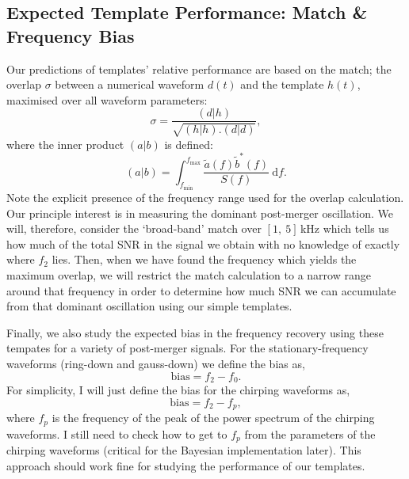 \documentclass[showpacs, superscriptaddress, showpacs, letterpaper, showkeys,
preprintnumbers, altaffilletter, amssymb, amsmath, amsfonts, prd,
onecolumn, floatfix, nofootinbib]{revtex4-1}
\newcommand{\diff}{{\mathrm d}}
\begin{document}
\subsection{Expected Template Performance: Match \& Frequency Bias}
Our predictions of templates' relative performance are based on the match; the
overlap $\sigma$ between a numerical waveform $d(t)$ and the template $h(t)$,
maximised over all waveform parameters:
%
\begin{equation}\label{eq:overlap}
\sigma = \frac{(d|h)}{\sqrt{(h|h).(d|d)}},
\end{equation}
%
where the inner product $(a|b)$ is defined:
%
\begin{equation}\label{eq:inner_product}
(a|b) = \int_{f_{\text{min}}}^{f_{\text{max}}}
\frac{\tilde{a}(f)\tilde{b}^*(f)}{S(f)}~\diff f.
\end{equation}
%
Note the explicit presence of the frequency range used for the overlap
calculation.  Our principle interest is in measuring the dominant post-merger
oscillation.  We will, therefore, consider the `broad-band' match over
$[1,~5]$\,kHz which tells us how much of the total SNR in the signal we obtain
with no knowledge of exactly where $f_2$ lies.  Then, when we have found the
frequency which yields the maximum overlap, we will restrict the match
calculation to a narrow range around that frequency in order to determine how
much SNR we can accumulate from that dominant oscillation using our simple
templates.

Finally, we also study the expected bias in the frequency recovery using these
tempates for a variety of post-merger signals.  For the stationary-frequency
waveforms (ring-down and gauss-down) we define the  bias as,
\begin{equation}\label{eq:stationary_bias}
\text{bias} = f_2 - f_0.
\end{equation}
%
For simplicity, I will just define the bias for the chirping waveforms as,
\begin{equation}\label{eq:chirp_bias}
\text{bias} = f_2 - f_p,
\end{equation}
%
where $f_p$ is the frequency of the peak of the power spectrum of the chirping
waveforms.  I still need to check how to get to $f_p$ from the parameters of the
chirping waveforms (critical for the Bayesian implementation later).  This
approach should work fine for studying the performance of our templates.
\end{document}
